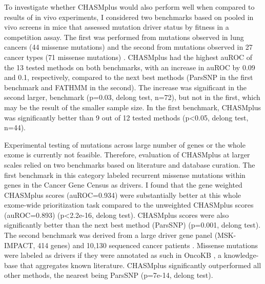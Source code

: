 To investigate whether CHASMplus would also perform well when compared to results of in vivo experiments, I considered two benchmarks based on pooled in vivo screens in mice that assessed mutation driver status by fitness in a competition assay.  The first was performed from mutations observed in lung cancers (44 missense mutations) \cite{RN141} and the second from mutations observed in 27 cancer types (71 missense mutations) \cite{RN143}. CHASMplus had the highest auROC of the 13 tested methods on both benchmarks, with an increase in auROC by 0.09 and 0.1, respectively, compared to the next best methods (ParsSNP in the first benchmark and FATHMM in the second). The increase was significant in the second larger, benchmark (p=0.03, delong test, n=72), but not in the first, which may be the result of the smaller sample size.  In the first benchmark, CHASMplus was significantly better than 9 out of 12 tested methods (p<0.05, delong test, n=44).

Experimental testing of mutations across large number of genes or the whole exome is currently not feasible. Therefore, evaluation of CHASMplus at larger scales relied on two benchmarks based on literature and database curation. The first benchmark in this category labeled recurrent missense mutations within genes in the Cancer Gene Census \cite{RN97} as drivers. I found that the gene weighted CHASMplus scores (auROC=0.934) were substantially better at this whole exome-wide prioritization task compared to the unweighted CHASMplus scores (auROC=0.893) (p<2.2e-16, delong test). CHASMplus scores were also significantly better than the next best method (ParsSNP) (p=0.001, delong test). The second benchmark was derived from a large driver gene panel (MSK-IMPACT, 414 genes) and 10,130 sequenced cancer patients \cite{RN145}.  Missense mutations were labeled as drivers if they were annotated as such in OncoKB \cite{RN144}, a knowledge-base that aggregates known literature. CHASMplus significantly outperformed all other methods, the nearest being ParsSNP (p=7e-14, delong test). 

